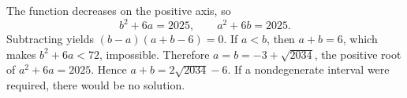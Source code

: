 The function decreases on the positive axis, so
\[
b^2+6a=2025,\qquad a^2+6b=2025.
\]
Subtracting yields $(b-a)(a+b-6)=0$. If $a<b$, then $a+b=6$, which makes $b^2+6a<72$, impossible. Therefore $a=b=-3+\sqrt{2034}$, the positive root of $a^2+6a=2025$. Hence $\boxed{a+b=2\sqrt{2034}-6}$. If a nondegenerate interval were required, there would be no solution.
